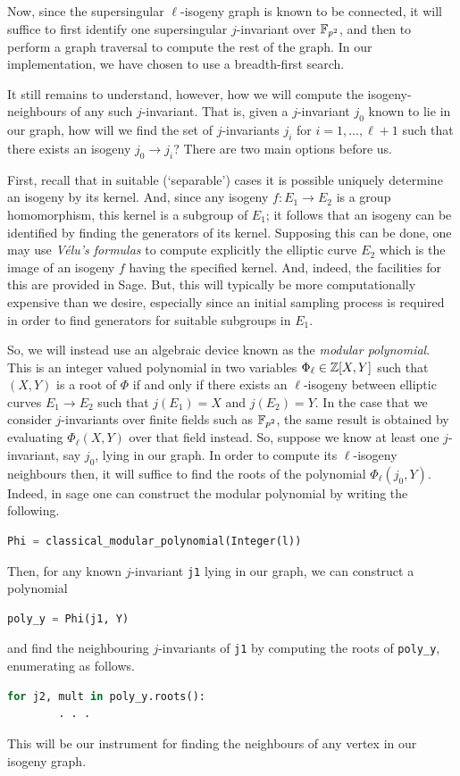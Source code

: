         Now, since the supersingular $\ell$-isogeny graph is known to be connected, it will suffice to first identify one supersingular $j$-invariant over $\mathbb{F}_{p^2}$, and then to perform a graph traversal to compute the rest of the graph. In our implementation, we have chosen to use a breadth-first search.

        It still remains to understand, however, how we will compute the isogeny-neighbours of any such $j$-invariant. That is, given a $j$-invariant $j_0$ known to lie in our graph, how will we find the set of $j$-invariants $j_i$ for $i=1,\dots,\ell+1$ such that there exists an isogeny $j_0 \to j_i$? There are two main options before us.

        First, recall that in suitable (`separable') cases it is possible uniquely determine an isogeny by its kernel. And, since any isogeny $f \colon E_1 \to E_2$ is a group homomorphism, this kernel is a subgroup of $E_1$; it follows that an isogeny can be identified by finding the generators of its kernel. Supposing this can be done, one may use \textit{V\'elu's formulas} to compute explicitly the elliptic curve $E_2$ which is the image of an isogeny $f$ having the specified kernel. And, indeed, the facilities for this are provided in Sage. But, this will typically be more computationally expensive than we desire, especially since an initial sampling process is required in order to find generators for suitable subgroups in $E_1$.

        So, we will instead use an algebraic device known as the \textit{modular polynomial}. This is an integer valued polynomial in two variables $\Phi_\ell \in \mathbb{Z}[X,Y]$ such that $(X,Y)$ is a root of $\Phi$ if and only if there exists an $\ell$-isogeny between elliptic curves $E_1 \to E_2$ such that $j(E_1) = X$ and $j(E_2) = Y$. In the case that we consider $j$-invariants over finite fields such as $\mathbb{F}_{p^2}$, the same result is obtained by evaluating $\Phi_\ell(X,Y)$ over that field instead. So, suppose we know at least one $j$-invariant, say $j_0$, lying in our graph. In order to compute its $\ell$-isogeny neighbours then, it will suffice to find the roots of the polynomial $\Phi_\ell(j_0, Y)$. Indeed, in sage one can construct the modular polynomial by writing the following.
\begin{lstlisting}[language=Python]
    Phi = classical_modular_polynomial(Integer(l))
\end{lstlisting}
        Then, for any known $j$-invariant \texttt{j1} lying in our graph, we can construct a polynomial
\begin{lstlisting}[language=Python]
    poly_y = Phi(j1, Y)
\end{lstlisting}
        and find the neighbouring $j$-invariants of \verb|j1| by computing the roots of \verb|poly_y|, enumerating as follows.
\begin{lstlisting}[language=Python]
    for j2, mult in poly_y.roots():
        . . .
\end{lstlisting}
    This will be our instrument for finding the neighbours of any vertex in our isogeny graph. 

